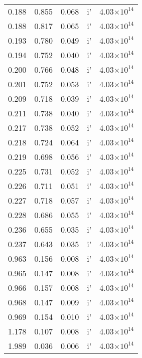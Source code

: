 \documentclass{aa}
\begin{document}
{\begin{longtable}{c|c|c|c|c}
  0.188 &   0.855 &  0.068 & i'        &  4.03$\times 10^{14}$    \\
  0.188 &   0.817 &  0.065 & i'        &  4.03$\times 10^{14}$    \\
  0.193 &   0.780 &  0.049 & i'        &  4.03$\times 10^{14}$    \\
  0.194 &   0.752 &  0.040 & i'        &  4.03$\times 10^{14}$    \\
  0.200 &   0.766 &  0.048 & i'        &  4.03$\times 10^{14}$    \\
  0.201 &   0.752 &  0.053 & i'        &  4.03$\times 10^{14}$    \\
  0.209 &   0.718 &  0.039 & i'        &  4.03$\times 10^{14}$    \\
  0.211 &   0.738 &  0.040 & i'        &  4.03$\times 10^{14}$    \\
  0.217 &   0.738 &  0.052 & i'        &  4.03$\times 10^{14}$    \\
  0.218 &   0.724 &  0.064 & i'        &  4.03$\times 10^{14}$    \\
  0.219 &   0.698 &  0.056 & i'        &  4.03$\times 10^{14}$    \\
  0.225 &   0.731 &  0.052 & i'        &  4.03$\times 10^{14}$    \\
  0.226 &   0.711 &  0.051 & i'        &  4.03$\times 10^{14}$    \\
  0.227 &   0.718 &  0.057 & i'        &  4.03$\times 10^{14}$    \\
  0.228 &   0.686 &  0.055 & i'        &  4.03$\times 10^{14}$    \\
  0.236 &   0.655 &  0.035 & i'        &  4.03$\times 10^{14}$    \\
  0.237 &   0.643 &  0.035 & i'        &  4.03$\times 10^{14}$    \\
  0.963 &   0.156 &  0.008 & i'        &  4.03$\times 10^{14}$    \\
  0.965 &   0.147 &  0.008 & i'        &  4.03$\times 10^{14}$    \\
  0.966 &   0.157 &  0.008 & i'        &  4.03$\times 10^{14}$    \\
  0.968 &   0.147 &  0.009 & i'        &  4.03$\times 10^{14}$    \\
  0.969 &   0.154 &  0.010 & i'        &  4.03$\times 10^{14}$    \\
  1.178 &   0.107 &  0.008 & i'        &  4.03$\times 10^{14}$    \\
  1.989 &   0.036 &  0.006 & i'        &  4.03$\times 10^{14}$    \\

\end{longtable}}
\end{document}
